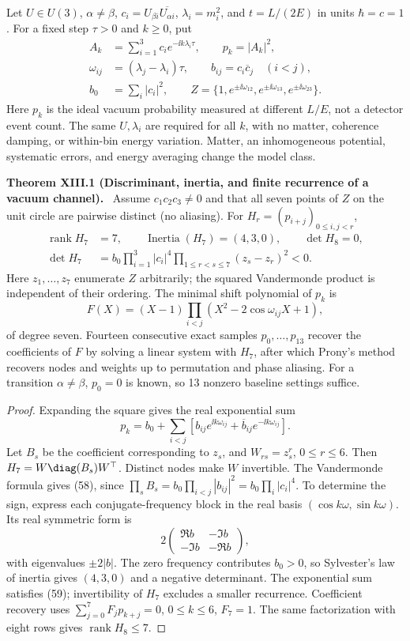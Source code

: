 \documentclass[11pt,a4paper,oneside]{book}
\DeclareMathOperator{\rank}{rank}\DeclareMathOperator{\Tr}{Tr}
\newcommand{\statement}[3]{\par\medskip\noindent\textbf{#1 #2 (#3).}\ }
\begin{document}
Let $U\in U(3)$, $\alpha\ne\beta$, $c_i=U_{\beta i}\overline{U_{\alpha i}}$, $\lambda_i=m_i^2$, and $t=L/(2E)$ in units $\hbar=c=1$. For a fixed step $\tau>0$ and $k\ge0$, put
\begin{align}A_k&=\sum_{i=1}^3c_i e^{-\ii k\lambda_i\tau},\qquad p_k=|A_k|^2,\tag{54}\\
\omega_{ij}&=(\lambda_j-\lambda_i)\tau,\qquad b_{ij}=c_i\overline c_j\quad(i<j),\tag{55}\\
b_0&=\sum_i|c_i|^2,\qquad Z=\{1,e^{\pm\ii\omega_{12}},e^{\pm\ii\omega_{13}},e^{\pm\ii\omega_{23}}\}.\tag{56}\end{align}
Here $p_k$ is the ideal vacuum probability measured at different $L/E$, not a detector event count. The same $U,\lambda_i$ are required for all $k$, with no matter, coherence damping, or within-bin energy variation. Matter, an inhomogeneous potential, systematic errors, and energy averaging change the model class.
\statement{Theorem}{XIII.1}{Discriminant, inertia, and finite recurrence of a vacuum channel} Assume $c_1c_2c_3\ne0$ and that all seven points of $Z$ on the unit circle are pairwise distinct (no aliasing). For $H_r=(p_{i+j})_{0\le i,j<r}$,
\begin{align}\rank H_7&=7,\qquad\operatorname{Inertia}(H_7)=(4,3,0),\qquad\det H_8=0,\tag{57}\\
\det H_7&=b_0\prod_{i=1}^3|c_i|^4\prod_{1\le r<s\le7}(z_s-z_r)^2<0.\tag{58}\end{align}
Here $z_1,\ldots,z_7$ enumerate $Z$ arbitrarily; the squared Vandermonde product is independent of their ordering. The minimal shift polynomial of $p_k$ is
\begin{equation}F(X)=(X-1)\prod_{i<j}(X^2-2\cos\omega_{ij}X+1),\tag{59}\end{equation}
of degree seven. Fourteen consecutive exact samples $p_0,\ldots,p_{13}$ recover the coefficients of $F$ by solving a linear system with $H_7$, after which Prony's method recovers nodes and weights up to permutation and phase aliasing. For a transition $\alpha\ne\beta$, $p_0=0$ is known, so 13 nonzero baseline settings suffice.
\begin{proof}Expanding the square gives the real exponential sum
\[p_k=b_0+\sum_{i<j}\left[b_{ij}e^{\ii k\omega_{ij}}+\overline b_{ij}e^{-\ii k\omega_{ij}}\right].\]
Let $B_s$ be the coefficient corresponding to $z_s$, and $W_{rs}=z_s^r$, $0\le r\le6$. Then $H_7=W\diag(B_s)W^\top$. Distinct nodes make $W$ invertible. The Vandermonde formula gives (58), since $\prod_sB_s=b_0\prod_{i<j}|b_{ij}|^2=b_0\prod_i|c_i|^4$. To determine the sign, express each conjugate-frequency block in the real basis $(\cos k\omega,\sin k\omega)$. Its real symmetric form is
\[2\begin{pmatrix}\Re b&-\Im b\\-\Im b&-\Re b\end{pmatrix},\]
with eigenvalues $\pm2|b|$. The zero frequency contributes $b_0>0$, so Sylvester's law of inertia gives $(4,3,0)$ and a negative determinant. The exponential sum satisfies (59); invertibility of $H_7$ excludes a smaller recurrence. Coefficient recovery uses $\sum_{j=0}^7F_jp_{k+j}=0$, $0\le k\le6$, $F_7=1$. The same factorization with eight rows gives $\rank H_8\le7$.\end{proof}
\end{document}
